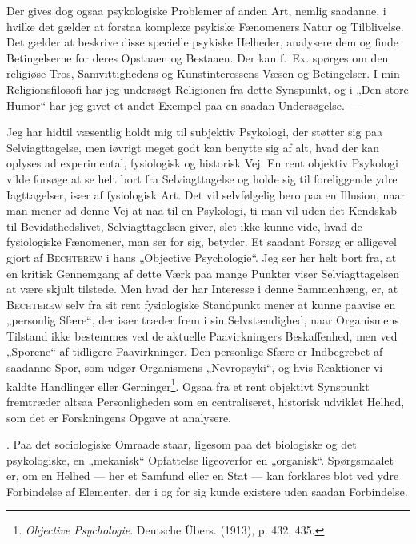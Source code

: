 \documentclass[12pt]{article}
\newcommand{\opage}[1]{\marginnote{\footnotesize\textit{[#1]}}}
\begin{document}
\setcounter{footnote}{0}%
\opage{59}Der gives dog ogsaa psykologiske Problemer af anden Art, nemlig saadanne,
i hvilke det gælder at forstaa komplexe psykiske Fænomeners Natur og Tilblivelse.
Det gælder at beskrive disse specielle psykiske Helheder, analysere dem og finde
Betingelserne for deres Opstaaen og Bestaaen. Der kan f.~Ex. spørges om den
religiøse Tros, Samvittighedens og Kunstinteressens Væsen og Betingelser. I min
Religionsfilosofi har jeg undersøgt Religionen fra dette Synspunkt, og i „Den store
Humor“ har jeg givet et andet Exempel paa en saadan Undersøgelse. ---

Jeg har hidtil væsentlig holdt mig til subjektiv Psykologi, der støtter sig paa
Selviagttagelse, men iøvrigt meget godt kan benytte sig af alt, hvad der kan
oplyses ad experimental, fysiologisk og historisk Vej. En rent objektiv Psykologi
vilde forsøge at se helt bort fra Selviagttagelse og holde sig til foreliggende ydre
Iagttagelser, især af fysiologisk Art. Det vil selvfølgelig bero paa en Illusion, naar
man mener ad denne Vej at naa til en Psykologi, ti man vil uden det Kendskab
til Bevidsthedslivet, Selviagttagelsen giver, slet ikke kunne vide, hvad de fysiologiske
Fænomener, man ser for sig, betyder. Et saadant Forsøg er alligevel gjort af
\textsc{Bechterew} i hans „Objective Psychologie“. Jeg ser her helt bort fra, at en
kritisk Gennemgang af dette Værk paa mange Punkter viser Selviagttagelsen at være
skjult tilstede. Men hvad der har Interesse i denne Sammenhæng, er, at
\textsc{Bechterew} selv fra sit rent fysiologiske Standpunkt mener at kunne paavise
en „personlig Sfære“, der især træder frem i sin Selvstændighed, naar Organismens
Tilstand ikke bestemmes ved de aktuelle Paavirkningers Beskaffenhed, men ved
„Sporene“ af tidligere Paavirkninger. Den personlige Sfære er Indbegrebet af
saadanne Spor, som udgør Organismens „Nevropsyki“, og hvis Reaktioner vi kaldte
Handlinger eller Gerninger\footnote{\textit{Objective Psychologie}. Deutsche Übers.
(1913), p. 432, 435.}. Ogsaa fra et rent objektivt Synspunkt fremtræder altsaa
Personligheden som en centraliseret, historisk udviklet Helhed, som det er
Forskningens Opgave at analysere.

. Paa det sociologiske Omraade staar, ligesom paa det biologiske og det
psykologiske, en „mekanisk“ Opfattelse ligeoverfor en „organisk“. Spørgsmaalet
er, om en Helhed --- her et Samfund eller en Stat --- kan forklares blot ved ydre
Forbindelse af Elementer, der i og for sig kunde existere uden saadan Forbindelse.
\end{document}
